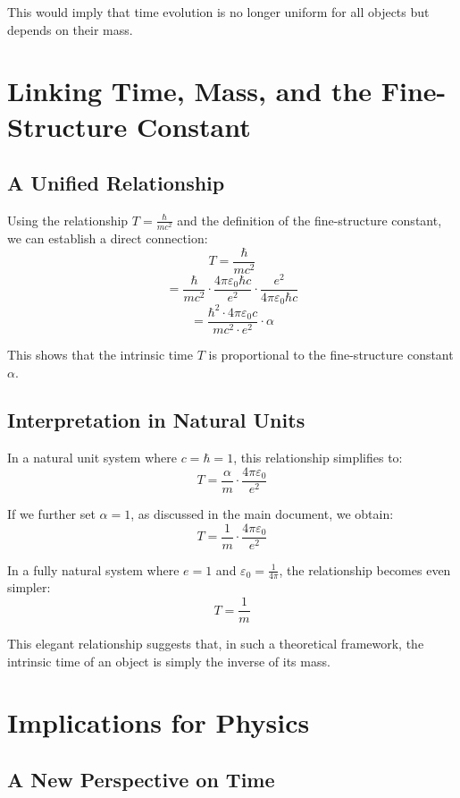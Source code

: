 \documentclass{article}
\begin{document}
	This would imply that time evolution is no longer uniform for all objects but depends on their mass.
	
	\section{Linking Time, Mass, and the Fine-Structure Constant}
	
	\subsection{A Unified Relationship}
	
	Using the relationship \(T = \frac{\hbar}{mc^2}\) and the definition of the fine-structure constant, we can establish a direct connection:
	\[
	T = \frac{\hbar}{mc^2}
	\]
	\[
	= \frac{\hbar}{mc^2} \cdot \frac{4\pi\varepsilon_0\hbar c}{e^2} \cdot \frac{e^2}{4\pi\varepsilon_0\hbar c}
	\]
	\[
	= \frac{\hbar^2 \cdot 4\pi\varepsilon_0 c}{mc^2 \cdot e^2} \cdot \alpha
	\]
	
	This shows that the intrinsic time \(T\) is proportional to the fine-structure constant \(\alpha\).
	
	\subsection{Interpretation in Natural Units}
	
	In a natural unit system where \(c = \hbar = 1\), this relationship simplifies to:
	\[
	T = \frac{\alpha}{m} \cdot \frac{4\pi\varepsilon_0}{e^2}
	\]
	
	If we further set \(\alpha = 1\), as discussed in the main document, we obtain:
	\[
	T = \frac{1}{m} \cdot \frac{4\pi\varepsilon_0}{e^2}
	\]
	
	In a fully natural system where \(e = 1\) and \(\varepsilon_0 = \frac{1}{4\pi}\), the relationship becomes even simpler:
	\[
	T = \frac{1}{m}
	\]
	
	This elegant relationship suggests that, in such a theoretical framework, the intrinsic time of an object is simply the inverse of its mass.
	
	\section{Implications for Physics}
	
	\subsection{A New Perspective on Time}
	
\end{document}
